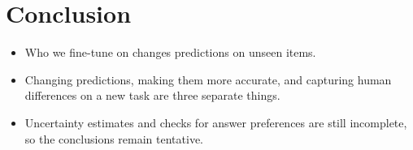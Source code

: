 \section{Conclusion}
\begin{itemize}
\item Who we fine-tune on changes predictions on unseen items.
\item Changing predictions, making them more accurate, and capturing human differences on a new task are three separate things.
\item Uncertainty estimates and checks for answer preferences are still incomplete, so the conclusions remain tentative.
\end{itemize}
